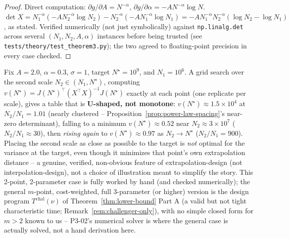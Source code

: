 \begin{proof}
Direct computation: $\partial g/\partial A = N^{-\alpha}$, $\partial g/\partial\alpha =
-A N^{-\alpha}\log N$. $\det X = N_1^{-\alpha}(-AN_2^{-\alpha}\log N_2) -
N_2^{-\alpha}(-AN_1^{-\alpha}\log N_1) = -A N_1^{-\alpha}N_2^{-\alpha}(\log N_2 - \log
N_1)$, as stated. Verified numerically (not just symbolically) against
\texttt{np.linalg.det} across several $(N_1,N_2,A,\alpha)$ instances before being
trusted (see \texttt{tests/theory/test\_theorem3.py}); the two agreed to floating-point
precision in every case checked.
\end{proof}

\begin{example}
\label{ex:nonmonotone-spacing}
Fix $A=2.0$, $\alpha=0.3$, $\sigma=1$, target $N^\star = 10^9$, and $N_1 = 10^6$. A grid
search over the second scale $N_2 \in (N_1, N^\star)$, computing $v(N^\star) =
J(N^\star)^\top (X^\top X)^{-1} J(N^\star)$ exactly at each point (one replicate per
scale), gives a table that is \textbf{U-shaped, not monotone}: $v(N^\star) \approx
1.5\times 10^4$ at $N_2/N_1 = 1.01$ %
(nearly clustered -- Proposition~\ref{prop:power-law-spacing}'s
near-zero determinant), falling to a minimum $v(N^\star) \approx 0.52$ %
near $N_2
\approx 3\times 10^7$ ($N_2/N_1 \approx 30$), then \emph{rising again} to
$v(N^\star)\approx 0.97$ as $N_2 \to N^\star$ ($N_2/N_1 = 900$). %
Placing the second
scale as close as possible to the target is \emph{not} optimal for the variance at the
target, even though it minimizes that point's own extrapolation distance -- a genuine,
verified, non-obvious feature of extrapolation-design (not interpolation-design), not a
choice of illustration meant to simplify the story. This 2-point, 2-parameter case is
fully worked by hand (and checked numerically); the general $m$-point, cost-weighted,
full 3-parameter (or higher) version is the design program
$T^{\mathrm{chal}}(\nu)$ of Theorem~\ref{thm:lower-bound} Part A (a valid but not tight
characteristic time; Remark~\ref{rem:challenger-only}), with no simple closed form for
$m>2$ known to us -- P3-02's numerical solver is where the general case is actually
solved, not a hand derivation here.
\end{example}

